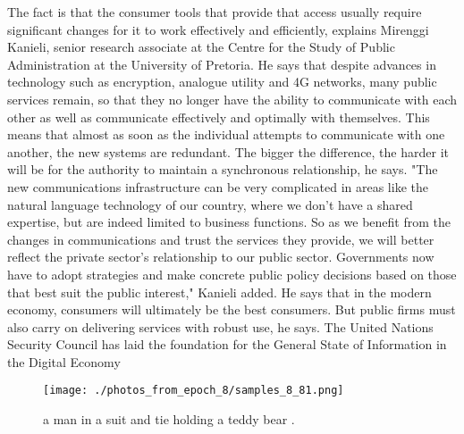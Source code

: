 \documentclass{article}%
\begin{document}
The fact is that the consumer tools that provide that access usually require significant changes for it to work effectively and efficiently, explains Mirenggi Kanieli, senior research associate at the Centre for the Study of Public Administration at the University of Pretoria. He says that despite advances in technology such as encryption, analogue utility and 4G networks, many public services remain, so that they no longer have the ability to communicate with each other as well as communicate effectively and optimally with themselves.\newline%
This means that almost as soon as the individual attempts to communicate with one another, the new systems are redundant. The bigger the difference, the harder it will be for the authority to maintain a synchronous relationship, he says.\newline%
"The new communications infrastructure can be very complicated in areas like the natural language technology of our country, where we don't have a shared expertise, but are indeed limited to business functions.\newline%
So as we benefit from the changes in communications and trust the services they provide, we will better reflect the private sector's relationship to our public sector. Governments now have to adopt strategies and make concrete public policy decisions based on those that best suit the public interest," Kanieli added.\newline%
He says that in the modern economy, consumers will ultimately be the best consumers. But public firms must also carry on delivering services with robust use, he says. The United Nations Security Council has laid the foundation for the General State of Information in the Digital Economy\newline%

%


\begin{figure}[h!]%
\centering%
\texttt{[image: ./photos\_from\_epoch\_8/samples\_8\_81.png]}%
\caption{a man in a suit and tie holding a teddy bear .}%
\end{figure}

%
\end{document}
